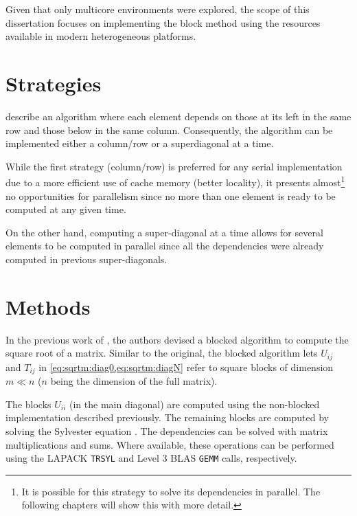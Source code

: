 \documentclass[../thesis]{subfiles}
\begin{document}
  Given that only multicore environments were explored, the scope of this dissertation focuses on implementing the block method using  the resources available in modern heterogeneous platforms.

	\section{Strategies}
		 describe an algorithm where each element depends on those at its left in the same row and those below in the same column. Consequently, the algorithm can be implemented either a column/row or a superdiagonal at a time.

		While the first strategy (column/row) is preferred for any serial implementation due to a more efficient use of cache memory (better locality), it presents almost\footnote{It is possible for this strategy to solve its dependencies in parallel. The following chapters will show this with more detail.} no opportunities for parallelism since no more than one element is ready to be computed at any given time.

		On the other hand, computing a super-diagonal at a time allows for several elements to be computed in parallel since all the dependencies were already computed in previous super-diagonals.

	\section{Methods}
		In the previous work of \citeauthor{Deadman:Higham:Ralha:2013}\xspace\cite{Deadman:Higham:Ralha:2013}, the authors devised a blocked algorithm to compute the square root of a matrix. Similar to the original, the blocked algorithm lets $U_{ij}$ and $T_{ij}$ in \cref{eq:sqrtm:diag0,eq:sqrtm:diagN} refer to square blocks of dimension $m \ll n$ ($n$ being the dimension of the full matrix).

		The blocks $U_{ii}$ (in the main diagonal) are computed using the non-blocked implementation described previously.
		The remaining blocks are computed by solving the Sylvester equation .
		The dependencies can be solved with matrix multiplications and sums.
		Where available, these operations can be performed using the LAPACK \texttt{TRSYL} and Level 3 BLAS \texttt{GEMM} calls, respectively.
\end{document}
